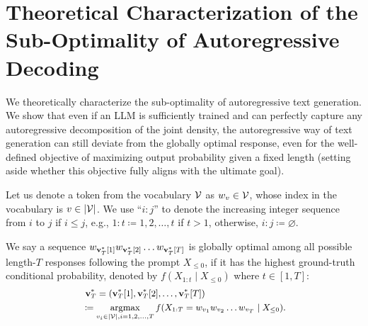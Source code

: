 \section{Theoretical Characterization of the Sub-Optimality of Autoregressive Decoding}\label{main:theory}
We theoretically characterize the sub-optimality of autoregressive text generation.
We show that even if an LLM is sufficiently trained and can perfectly capture any autoregressive decomposition of the joint density, the autoregressive way of text generation can still deviate from the globally optimal response, even for the well-defined objective of maximizing output probability given a fixed length (setting aside whether this objective fully aligns with the ultimate goal).

Let us denote a token from the vocabulary $\mathcal{V}$ as $w_v \in \mathcal{V}$, whose index in the vocabulary is $v \in \lvert \mathcal{V} \rvert$.
We use ``$i:j$'' to denote the increasing integer sequence from $i$ to $j$ if $i \leq j$, e.g., $1:t \coloneqq 1, 2, \ldots, t$ if $t > 1$, otherwise, $i:j \coloneqq \varnothing$.

\begin{definition}\label{def:optimal_sequence}
    We say a sequence $w_{\mathbf{v}_T^*[1]} w_{\mathbf{v}_T^*[2]} \ldots w_{\mathbf{v}_T^*[T]}$ is globally optimal among all possible length-$T$ responses following the prompt $X_{\leq 0}$, if it has the highest ground-truth conditional probability, denoted by $f(X_{1:t} \mid X_{\leq 0})$ where $t \in [1, T]$:
    \begin{equation}
        \small
        \begin{split}
             & ~ \mathbf{v}_T^* = (\mathbf{v}_T^*[1], \mathbf{v}_T^*[2], \ldots, \mathbf{v}_T^*[T])                                                                 \\
             & \coloneqq \operatorname*{argmax}_{v_i \in \lvert \mathcal{V} \rvert, i=1,2,\ldots,T} f(X_{1:T} = w_{v_1} w_{v_2} \ldots w_{v_T} \mid X_{\leq 0}).
        \end{split}
    \end{equation}
\end{definition}


